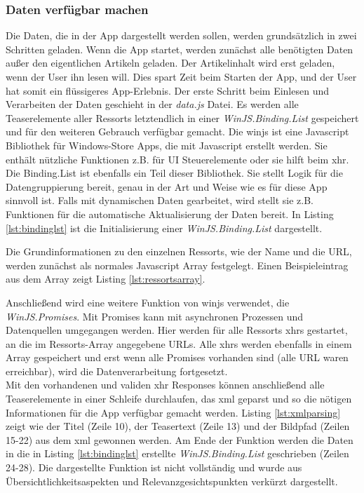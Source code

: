 \documentclass[12pt,a4paper,bibtotoc,abstracton]{scrartcl}
\begin{document}
\subsubsection{Daten verfügbar machen}
\label{subsubsec:datenverfügbarmachen}
Die Daten, die in der App dargestellt werden sollen, werden grundsätzlich in zwei Schritten geladen. Wenn die App startet, werden zunächst alle benötigten Daten außer den eigentlichen Artikeln geladen. Der Artikelinhalt wird erst geladen, wenn der User ihn lesen will. Dies spart Zeit beim Starten der App, und der User hat somit ein flüssigeres App-Erlebnis. Der erste Schritt beim Einlesen und Verarbeiten der Daten geschieht in der \textit{data.js} Datei. Es werden alle Teaserelemente aller Ressorts letztendlich in einer  \textit{WinJS.Binding.List} gespeichert und für den weiteren Gebrauch verfügbar gemacht. Die \ac{winjs} ist eine Javascript Bibliothek für Windows-Store Apps, die mit Javascript erstellt werden. Sie enthält nützliche Funktionen z.B. für UI Steuerelemente oder sie hilft beim \ac{xhr}. Die Binding.List ist ebenfalls ein Teil dieser Bibliothek. Sie stellt Logik für die Datengruppierung bereit, genau in der Art und Weise wie es für diese App sinnvoll ist. Falls mit dynamischen Daten gearbeitet, wird stellt sie z.B. Funktionen für die automatische Aktualisierung der Daten bereit. In Listing \ref{lst:bindinglst} ist die Initialisierung einer \textit{WinJS.Binding.List} dargestellt.

\begin{minipage}{\linewidth}

\end{minipage}

Die Grundinformationen zu den einzelnen Ressorts, wie der Name und die URL, werden zunächst als normales Javascript Array festgelegt. Einen Beispieleintrag aus dem Array zeigt Listing \ref{lst:ressortsarray}.

\begin{minipage}{\linewidth}

\end{minipage}

Anschließend wird eine weitere Funktion von \ac{winjs} verwendet, die \textit{WinJS.Promises}. Mit Promises kann mit asynchronen Prozessen und Datenquellen umgegangen werden. Hier werden für alle Ressorts \ac{xhr}s gestartet, an die im Ressorts-Array angegebene URLs. Alle \ac{xhr}s werden ebenfalls in einem Array gespeichert und erst wenn alle Promises vorhanden sind (alle URL waren erreichbar), wird die Datenverarbeitung fortgesetzt. \\
Mit den vorhandenen und validen \ac{xhr} Responses können anschließend alle Teaserelemente in einer Schleife durchlaufen, das \ac{xml} geparst und so die nötigen Informationen für die App verfügbar gemacht werden. Listing \ref{lst:xmlparsing} zeigt wie der Titel (Zeile 10), der Teasertext (Zeile 13) und der Bildpfad (Zeilen 15-22) aus dem \ac{xml} gewonnen werden. Am Ende der Funktion werden die Daten in die in Listing \ref{lst:bindinglst} erstellte \textit{WinJS.Binding.List} geschrieben (Zeilen 24-28). Die dargestellte Funktion ist nicht vollständig und wurde aus Übersichtlichkeitsaspekten und Relevanzgesichtspunkten verkürzt dargestellt.
\end{document}
